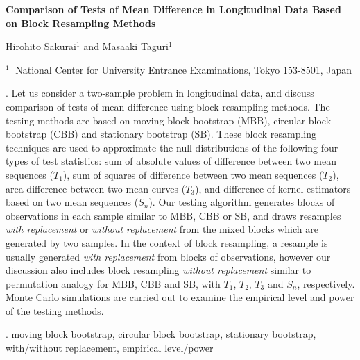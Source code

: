 \documentclass[12pt]{article}
\begin{document}
\begin{flushleft}
{\LARGE\bf Comparison of Tests of Mean Difference in Longitudinal Data
Based on Block Resampling Methods}

\vspace{1.0cm}

Hirohito Sakurai$^1$ and Masaaki Taguri$^1$

\begin{description}
\item $^1 \;$ National Center for University Entrance Examinations,
Tokyo 153-8501, Japan
\end{description}
\end{flushleft}


\vspace{0.75cm}

. 
Let us consider a two-sample problem in longitudinal data, and
discuss comparison of tests of mean difference using
block resampling methods. The testing methods are based on
moving block bootstrap (MBB), circular block bootstrap (CBB)
and stationary bootstrap (SB). These block resampling techniques
are used to approximate the null distributions of the following
four types of test statistics:
sum of absolute values of difference between two mean sequences ($T_1$),
sum of squares of difference between two mean sequences ($T_2$),
area-difference between two mean curves ($T_3$), and
difference of kernel estimators based on two mean sequences ($S_n$).
Our testing algorithm generates blocks of observations in each sample
similar to MBB, CBB or SB, and draws resamples \textit{with replacement}
or \textit{without replacement} from
the mixed blocks which are generated by two samples.
In the context of block resampling, a resample is usually generated
\textit{with replacement}
from blocks of observations,
however our discussion also includes block resampling
\textit{without replacement} similar to permutation analogy
for MBB, CBB and SB, with $T_1$, $T_2$, $T_3$ and $S_n$, respectively.
Monte Carlo simulations are carried out to examine
the empirical level and power of the testing methods.

\vskip 2mm

.
moving block bootstrap, circular block bootstrap, stationary bootstrap,
with/without replacement, empirical level/power
\end{document}
